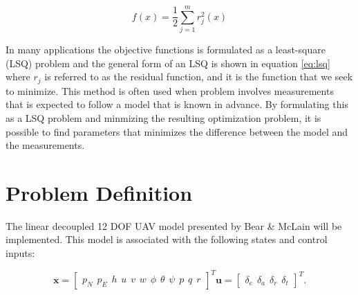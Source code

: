 \begin{equation}
	\label{eq:lsq}
	f(x) = \frac{1}{2} \sum_{j=1}^m r_j^2(x)
\end{equation}

In many applications the objective functions is formulated as a least-square (LSQ) problem and the general form of an LSQ is shown in equation \ref{eq:lsq} \cite{nocedalOPTIMIZATION} where $r_j$ is referred to as the residual function, and it is the function that we seek to minimize. This method is often used when problem involves measurements that is expected to follow a model that is known in advance. By formulating this as a LSQ problem and minmizing the resulting optimization problem, it is possible to find parameters that minimizes the difference between the model and the measurements. 


\section{Problem Definition}

The linear decoupled 12 DOF UAV model presented by Bear \& McLain \cite{uavBEARD} will be implemented. This model is associated with the following states and control inputs:

\begin{subequations}
\begin{equation}
	\mathbf{x} =
	\begin{bmatrix}
		p_N \hspace{5pt} p_E \hspace{5pt} h \hspace{5pt}
		u \hspace{5pt} v \hspace{5pt} w \hspace{5pt}
		\phi \hspace{5pt} \theta \hspace{5pt} \psi \hspace{5pt}
		p \hspace{5pt} q \hspace{5pt} r
	\end{bmatrix}^T
\end{equation}
\begin{equation}
	\mathbf{u} =
	\begin{bmatrix}
		\delta_e \hspace{5pt} \delta_a \hspace{5pt} \delta_r \hspace{5pt} \delta_t
	\end{bmatrix}^T.
\end{equation}
\end{subequations}


